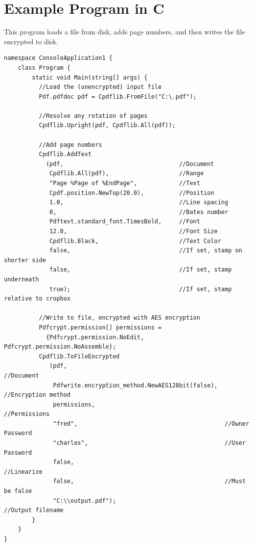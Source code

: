 \documentclass[a4paper]{memoir}
\begin{document}
\chapter{Example Program in C}
This program loads a file from disk, adds page numbers, and then writes the file encrypted to disk.
\begin{small}
\begin{verbatim}
namespace ConsoleApplication1 {
    class Program {
        static void Main(string[] args) {
          //Load the (unencrypted) input file
          Pdf.pdfdoc pdf = Cpdflib.FromFile("C:\.pdf");

          //Resolve any rotation of pages
          Cpdflib.Upright(pdf, Cpdflib.All(pdf));

          //Add page numbers
          Cpdflib.AddText
            (pdf,                                 //Document
             Cpdflib.All(pdf),                    //Range
             "Page %Page of %EndPage",            //Text
             Cpdf.position.NewTop(20.0),          //Position
             1.0,                                 //Line spacing
             0,                                   //Bates number
             Pdftext.standard_font.TimesBold,     //Font
             12.0,                                //Font Size
             Cpdflib.Black,                       //Text Color
             false,                               //If set, stamp on shorter side
             false,                               //If set, stamp underneath
             true);                               //If set, stamp relative to cropbox

          //Write to file, encrypted with AES encryption
          Pdfcrypt.permission[] permissions =
            {Pdfcrypt.permission.NoEdit, Pdfcrypt.permission.NoAssemble};
          Cpdflib.ToFileEncrypted
             (pdf,                                             //Document
              Pdfwrite.encryption_method.NewAES128bit(false),  //Encryption method
              permissions,                                     //Permissions
              "fred",                                          //Owner Password
              "charles",                                       //User Password
              false,                                           //Linearize
              false,                                           //Must be false
              "C:\\output.pdf");                               //Output filename
        }
    }
}
\end{verbatim}
\end{small}

\backmatter
\printindex
\end{document}
